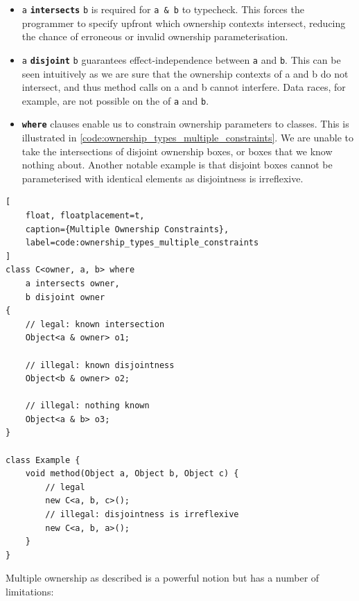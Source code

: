 \documentclass{acm_proc_article-sp}
\begin{document}
\begin{itemize}

    \item \lstinline{a} \textbf{\lstinline|intersects|} \lstinline{b} is
        required for \lstinline|a & b| to typecheck. This forces the programmer
        to specify upfront which ownership contexts intersect, reducing the
        chance of erroneous or invalid ownership parameterisation.

    \item \lstinline{a} \textbf{\lstinline|disjoint|} \lstinline{b} guarantees
        effect-independence between \lstinline{a} and \lstinline{b}. This can be
        seen intuitively as we are sure that the ownership contexts of a and b
        do not intersect, and thus method calls on a and b cannot interfere.
        Data races, for example, are not possible on the of \lstinline{a} and
        \lstinline{b}.

    \item \textbf{\lstinline|where|} clauses enable us to constrain ownership
        parameters to classes. This is illustrated in
        \cref{code:ownership_types_multiple_constraints}. We are unable to take
        the intersections of disjoint ownership boxes, or boxes that we know
        nothing about. Another notable example is that disjoint boxes cannot be
        parameterised with identical elements as disjointness is irreflexive.

\end{itemize}

\begin{lstlisting}[
	float, floatplacement=t,
	caption={Multiple Ownership Constraints},
	label=code:ownership_types_multiple_constraints
]
class C<owner, a, b> where
	a intersects owner,
	b disjoint owner
{
	// legal: known intersection
	Object<a & owner> o1;

	// illegal: known disjointness
	Object<b & owner> o2;

	// illegal: nothing known
	Object<a & b> o3;
}

class Example {
	void method(Object a, Object b, Object c) {
		// legal
		new C<a, b, c>();
		// illegal: disjointness is irreflexive
		new C<a, b, a>();
	}
}
\end{lstlisting}

Multiple ownership as described is a powerful notion but has a number of
limitations:
\end{document}
